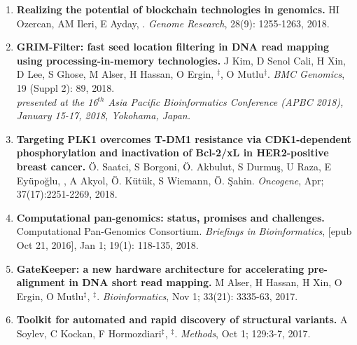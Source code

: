 \begin{enumerate}
         \item

         {\bf Realizing the potential of blockchain technologies in genomics.}
         HI Ozercan, AM Ileri, E Ayday, \calkan{}.
         {\em Genome Research}, 28(9): 1255-1263, 2018.

          \item

         {\bf GRIM-Filter: fast seed location filtering in DNA read mapping using processing-in-memory technologies.}
         J Kim, D Senol Cali, H Xin, D Lee, S Ghose, M Alser, H Hassan, O Ergin, \calkan{}$^\ddag$, O Mutlu$^\ddag$.
         {\em BMC Genomics}, 19 (Suppl 2): 89, 2018.\\
         \hspace*{1cm}
          {\footnotesize \em presented at the 16$^{th}$ Asia Pacific Bioinformatics Conference (APBC 2018), January 15-17, 2018, Yokohama, Japan.}

         \item        

         {\bf Targeting PLK1 overcomes T-DM1 resistance via CDK1-dependent phosphorylation and inactivation of Bcl-2/xL in HER2-positive breast cancer.}
         Ö. Saatci, S Borgoni, Ö. Akbulut, S Durmuş, U Raza, E Eyüpoğlu, \calkan{}, A Akyol, Ö. Kütük, S Wiemann, Ö. Şahin.         
         {\em Oncogene}, Apr;  37(17):2251-2269, 2018.

         \item        

         {\bf Computational pan-genomics: status, promises and challenges.}
         Computational Pan-Genomics Consortium. {\em Briefings in Bioinformatics}, [epub Oct 21, 2016], Jan 1; 19(1): 118-135, 2018.
         
         \item
         
         {\bf GateKeeper: a new hardware architecture for accelerating pre-alignment in DNA short read mapping.}
         M Alser, H Hassan, H Xin, O Ergin, O Mutlu$^\ddag$, \calkan{}$^\ddag$.
         {\em Bioinformatics}, Nov 1;  33(21): 3335-63, 2017.

         \item
         {\bf Toolkit for automated and rapid discovery of structural variants.}
          A Soylev, C Kockan, F Hormozdiari$^\ddag$, \calkan{}$^\ddag$.
          {\em Methods}, Oct 1; 129:3-7, 2017.
                                       
\clearpage


\end{enumerate}
